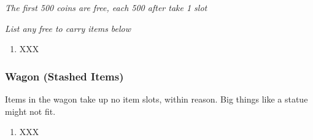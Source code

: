 \documentclass[10pt]{article}
\providecommand{\tightlist}{%
  \setlength{\itemsep}{0pt}\setlength{\parskip}{0pt}}
\begin{document}
\begin{multicols}{2}
\emph{The first 500 coins are free, each 500 after take 1 slot}

\emph{List any free to carry items below}

\begin{enumerate}
\tightlist
\item
  XXX
\end{enumerate}

\subsubsection{Wagon (Stashed Items)}\label{wagon-stashed-items}

Items in the wagon take up no item slots, within reason. Big things like
a statue might not fit.

\begin{enumerate}
\tightlist
\item
  XXX
\end{enumerate}

\end{multicols}
\end{document}
